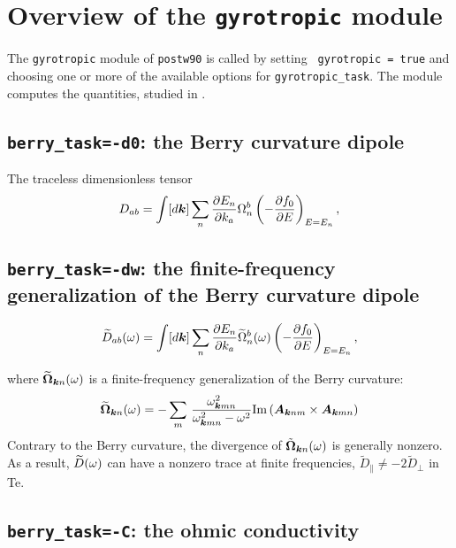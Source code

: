 \chapter{Overview of the {\tt gyrotropic} module}
\label{ch:berry}

The {\tt gyrotropic} module of {\tt postw90} is called by setting {\tt
  gyrotropic = true} and choosing one or more of the available options for
{\tt gyrotropic\_task}. The module computes the quantities, studied in 
 \cite{tsirkin-arxiv17}.

\section{{\tt berry\_task=-d0}: the Berry curvature dipole  }

The traceless dimensionless tensor
\begin{equation}
\label{eq:D_ab}
D_{ab}=\int[d{\bm k}]\sum_n
\frac{\partial E_n}{\partial{k_a}}
\Omega_n^b
\left(-\frac{\partial f_0}{\partial E}\right)_{E=E_n},
\end{equation}


\section{{\tt berry\_task=-dw}: the finite-frequency generalization of the Berry curvature dipole  }

\begin{equation}
\label{eq:D-tilde}
\widetilde{D}_{ab}(\omega)=\int[d{\bm k}]\sum_n
\frac{\partial E_n}{\partial{k_a}}\widetilde\Omega^b_n(\omega)
\left(-\frac{\partial f_0}{\partial E}\right)_{E=E_n},
\end{equation}

where $\widetilde{\bm\Omega}_{{\bm k} n}(\omega)$ is a finite-frequency
generalization of the Berry curvature:
%
%
\begin{equation}
\label{eq:curv-w}
\widetilde{\bm\Omega}_{{\bm k} n}(\omega)=-
\sum_m\,\frac{\omega^2_{{\bm k} mn}}{\omega^2_{{\bm k} mn}-\omega^2}
{\rm Im}\left({\bm A}_{{\bm k} nm}\times{\bm A}_{{\bm k} mn}\right)
\end{equation}
Contrary to the Berry
  curvature, the divergence of $\tilde{\bm\Omega}_{{\bm k} n}(\omega)$ is
  generally nonzero. As a result, $\widetilde{D}(\omega)$ 
can have a nonzero trace at finite frequencies, $\tilde{D}_\|\neq-2\tilde{D}_\perp$ in Te.

\section{{\tt berry\_task=-C}: the ohmic  conductivity }

